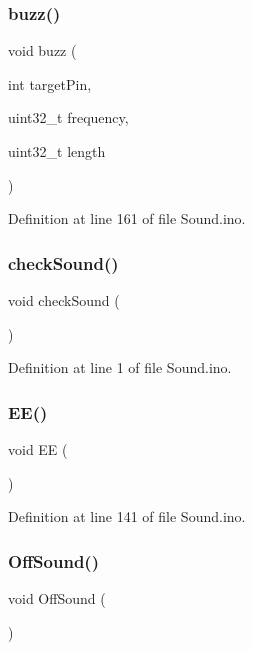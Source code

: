 \subsubsection{\texorpdfstring{buzz()}{buzz()}}
{\footnotesize\ttfamily void buzz (\begin{DoxyParamCaption}\item[{int}]{target\+Pin,  }\item[{uint32\+\_\+t}]{frequency,  }\item[{uint32\+\_\+t}]{length }\end{DoxyParamCaption})}



Definition at line 161 of file Sound.\+ino.

\mbox{\label{_sound_8ino_ab3ab841232cf3669258f48cb453422e2}} 
\subsubsection{\texorpdfstring{checkSound()}{checkSound()}}
{\footnotesize\ttfamily void check\+Sound (\begin{DoxyParamCaption}{ }\end{DoxyParamCaption})}



Definition at line 1 of file Sound.\+ino.

\mbox{\label{_sound_8ino_ae1968785b57f1ebac51ec2ccfcd4f58e}} 
\subsubsection{\texorpdfstring{EE()}{EE()}}
{\footnotesize\ttfamily void EE (\begin{DoxyParamCaption}{ }\end{DoxyParamCaption})}



Definition at line 141 of file Sound.\+ino.

\mbox{\label{_sound_8ino_abfa387c30742ec42b6f88869255e7d11}} 
\subsubsection{\texorpdfstring{OffSound()}{OffSound()}}
{\footnotesize\ttfamily void Off\+Sound (\begin{DoxyParamCaption}{ }\end{DoxyParamCaption})}



